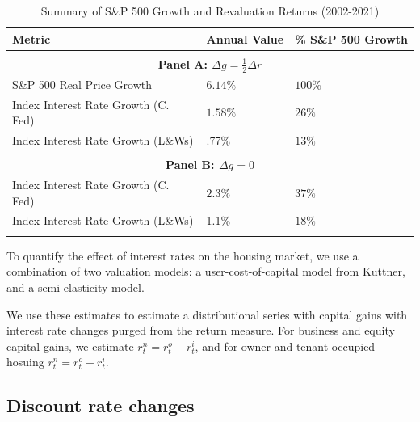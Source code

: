 \documentclass[12pt]{article}
\begin{document}
\begin{table}[h!]
    \centering
    \caption{Summary of S\&P 500 Growth and Revaluation Returns (2002-2021)}
    \label{tab:results_three_col}
    \begin{tabular}{lll}
        \hline
        \textbf{Metric} & \textbf{Annual Value} & \textbf{\% S\&P 500 Growth} \\
        \hline
        \\
          \multicolumn{3}{c}{\textbf{Panel A: $\Delta g = \frac{1}{2}\Delta r$}} \\
        \hline
        S\&P 500 Real Price Growth & $6.14\%$ & $ 100\%$ \\
        Index Interest Rate Growth (C. Fed) & $1.58\%$ & $26\%$ \\
        Index Interest Rate Growth (L\&Ws) & .77\% & $13\%$ \\
        \\
          \multicolumn{3}{c}{\textbf{Panel B: $\Delta g = 0$}} \\
        \hline
        Index Interest Rate Growth (C. Fed) & $2.3\%$ & $37\%$ \\
        Index Interest Rate Growth (L\&Ws) & 1.1\% & $18\%$ \\
        \\
        \hline
    \end{tabular}
\end{table}

To quantify the effect of interest rates on the housing market, we use a combination of two valuation models: a user-cost-of-capital model from Kuttner, and a semi-elasticity model.

We use these estimates to estimate a distributional series with capital gains with interest rate changes purged from the return measure. For business and equity capital gains, we estimate $r_t^n = r^o_t - r^i_t$, and for owner and tenant occupied hosuing $r_t^n = r^o_t - r^i_t$. 

\subsection{Discount rate changes} 
\end{document}
